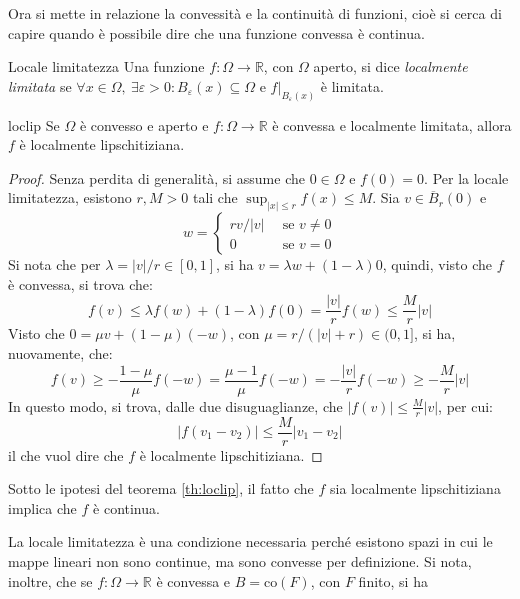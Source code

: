 \documentclass[11pt, a4paper]{scrartcl}
\theoremstyle{definition}
\numberwithin{esempio}{section}
\theoremstyle{definition}
\numberwithin{obs}{section}
\numberwithin{nota}{section}
\numberwithin{equation}{subsection}
\begin{document}
Ora si mette in relazione la convessit\`a e la continuit\`a di funzioni, cio\`e si cerca di capire quando \`e possibile dire che una funzione convessa \`e continua.
\begin{definizione}
	{Locale limitatezza}{}
	Una funzione $f: \Omega \to \mathbb{R}$, con $\Omega $ aperto, si dice \textit{localmente limitata} se $\forall x \in \Omega , \ \exists \varepsilon >0 : B_\varepsilon (x) \subseteq \Omega $ e $f |_{B_\varepsilon (x)} $ \`e limitata.
\end{definizione}
\begin{teorema}
	{}{loclip}
	Se $\Omega $ \`e convesso e aperto e $f:\Omega \to \mathbb{R}$ \`e convessa e localmente limitata, allora $f$ \`e localmente lipschitiziana. 
	\begin{proof}
		Senza perdita di generalit\`a, si assume che $0 \in \Omega $ e $f(0) = 0$.
		Per la locale limitatezza, esistono $r, M > 0$ tali che $\sup_{\lvert x \rvert \le  r} f(x) \le M$.
		Sia $v \in \overline{B}_r(0)$ e 
		\[
		w = \begin{cases}
			rv / \lvert v \rvert &\, \text{ se } v\neq 0\\
			0 &\, \text{ se } v = 0
		\end{cases}
		\] 
		Si nota che per $\lambda  = \lvert v \rvert  / r \in [0,1]$, si ha $v = \lambda w + (1-\lambda ) 0$, quindi, visto che $f$ \`e convessa, si trova che:
		\[
		f(v) \le \lambda f(w) + (1-\lambda ) f(0) = \frac{\lvert v \rvert }{r} f(w) \le \frac{M}{r} \lvert v \rvert 
		\] 
		Visto che $0 = \mu  v  + (1-\mu )(-w)$, con $\mu  = r / (\lvert v \rvert +r) \in (0,1]$, si ha, nuovamente, che:
		\[
		f(v) \ge - \frac{1-\mu }{\mu }f(-w) = \frac{\mu -1}{\mu } f(-w) = -\frac{\lvert v \rvert }{r} f(-w) \ge - \frac{M}{r}\lvert v \rvert 
		\] 
	In questo modo, si trova, dalle due disuguaglianze, che $\lvert f (v)\rvert \le \frac{M}{r} \lvert v \rvert  $, per cui:
	\[
	\lvert f(v_1-v_2) \rvert \le \frac{M}{r}\lvert v_1-v_2 \rvert 
	\] 
	il che vuol dire che $f$ \`e localmente lipschitiziana.
	\end{proof}
\end{teorema}
\begin{corollario}
	{}{}
	Sotto le ipotesi del teorema \ref{th:loclip}, il fatto che $f$ sia localmente lipschitiziana implica che $f$ \`e continua.
\end{corollario}
La locale limitatezza \`e una condizione necessaria perch\'e esistono spazi in cui le mappe lineari non sono continue, ma sono convesse per definizione.
Si nota, inoltre, che se $f:\Omega \to\mathbb{R}$ \`e convessa e $B = \mathrm{co} (F)$, con $F$ finito, si ha
\end{document}
